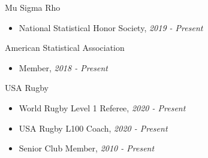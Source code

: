 
\Affiliation
{Mu Sigma Rho}
{\begin{itemize}
     \item National Statistical Honor Society, \emph{2019 - Present}
\end{itemize}}

\vspace*{0.01 in}

\Affiliation
{American Statistical Association}
{\begin{itemize}
    \item Member, \emph{2018 - Present}
\end{itemize}}

\vspace*{0.01 in}

\Affiliation
{USA Rugby}
{\begin{itemize}
    \item World Rugby Level 1 Referee, \emph{2020 - Present}
    \item USA Rugby L100 Coach, \emph{2020 - Present}
    \item Senior Club Member, \emph{2010 - Present}
\end{itemize}}